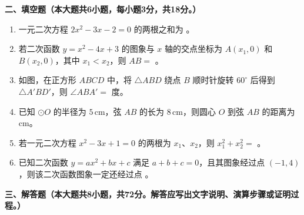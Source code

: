 \documentclass[12pt, a4paper]{ctexart}
\begin{document}
\vspace{0.5em}

\noindent\textbf{二、填空题（本大题共6小题，每小题3分，共18分。）}

\begin{enumerate}[label=\arabic*., start=11]

\item 一元二次方程 $2x^2 - 3x - 2 = 0$ 的两根之和为 \underline{\hspace{3cm}}。

\item 若二次函数 $y = x^2 - 4x + 3$ 的图象与 $x$ 轴的交点坐标为 $A(x_1, 0)$ 和 $B(x_2, 0)$，其中 $x_1 < x_2$，则 $AB =$ \underline{\hspace{3cm}}。

\item 如图，在正方形 $ABCD$ 中，将 $\triangle ABD$ 绕点 $B$ 顺时针旋转 $60^\circ$ 后得到 $\triangle A'BD'$，则 $\angle ABA' =$ \underline{\hspace{3cm}} 度。

\item 已知 $\odot O$ 的半径为 $5\,\text{cm}$，弦 $AB$ 的长为 $8\,\text{cm}$，则圆心 $O$ 到弦 $AB$ 的距离为 \underline{\hspace{3cm}} $\text{cm}$。

\item 若一元二次方程 $x^2 - 3x + 1 = 0$ 的两根为 $x_1$、$x_2$，则 $x_1^2 + x_2^2 =$ \underline{\hspace{3cm}}。

\item 已知二次函数 $y = ax^2 + bx + c$ 满足 $a + b + c = 0$，且其图象经过点 $(-1, 4)$，则该二次函数图象一定还经过点 \underline{\hspace{3cm}}。

\end{enumerate}

\vspace{0.5em}

\noindent\textbf{三、解答题（本大题共8小题，共72分。解答应写出文字说明、演算步骤或证明过程。）}
\end{document}
